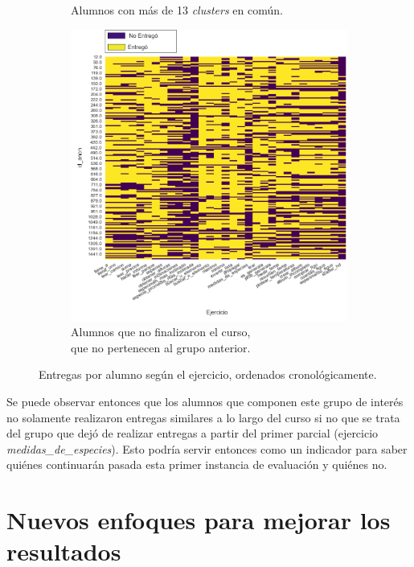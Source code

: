 \documentclass[11pt,a4paper,twoside,openany]{tesis}
\begin{document}
\begin{figure}[H]
\begin{subfigure}[t]{0.3\textwidth}
        \caption{Alumnos con más de 13 \emph{clusters} en común.}
        \label{fig:clique}
    \end{subfigure}
    \hfill
    \begin{subfigure}[t]{0.3\textwidth}
        \centering
        \includegraphics[width=\linewidth]{imagenes/entregas - no-clique13.png}
        \caption{Alumnos que no finalizaron el curso,\\que no pertenecen al grupo anterior.}
        \label{fig:noclique}
    \end{subfigure}
    \caption{Entregas por alumno según el ejercicio, ordenados cronológicamente.}
    \label{fig:figuras_juntas}
\end{figure}

Se puede observar entonces que los alumnos que componen este grupo de interés no solamente realizaron entregas similares a lo largo del curso si no que se trata del grupo que dejó de realizar entregas a partir del primer parcial (ejercicio \emph{medidas\_de\_especies}). Esto podría servir entonces como un indicador para saber quiénes continuarán pasada esta primer instancia de evaluación y quiénes no.


\section{Nuevos enfoques para mejorar los resultados}
\end{document}
